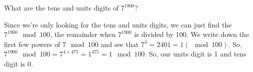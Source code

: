 \question What are the tens and units digits of $7^{1900}$?
\begin{solution}[.5cm]
Since we're only looking for the tens and units digits, we can just find the $7^{1900} \mod 100$, the remainder when $7^{1900}$ is divided by 100. We write down the first few powers of $7 \mod 100$ and see that $7^{4} = 2401 = 1 (\mod 100)$. So, $7^{1900} \mod 100 = 7^{4 \times 475}  = 1^{475} = 1 \mod 100$. So, our units digit is 1 and tens digit is 0. 
\end{solution}